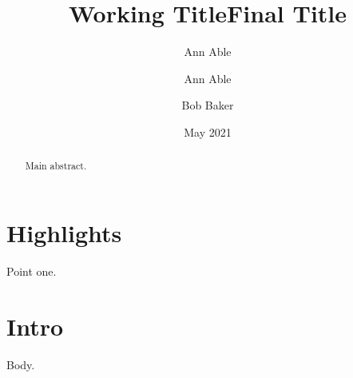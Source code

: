 \documentclass{article}
\title{Working Title}\author{Ann Able}\date{}
\begin{document}
\section*{Highlights} Point one.
\title{Final Title}\author{Ann Able \and Bob Baker}\date{May 2021}
\maketitle
\begin{abstract}Main abstract.\end{abstract}
\section{Intro} Body.
\end{document}
